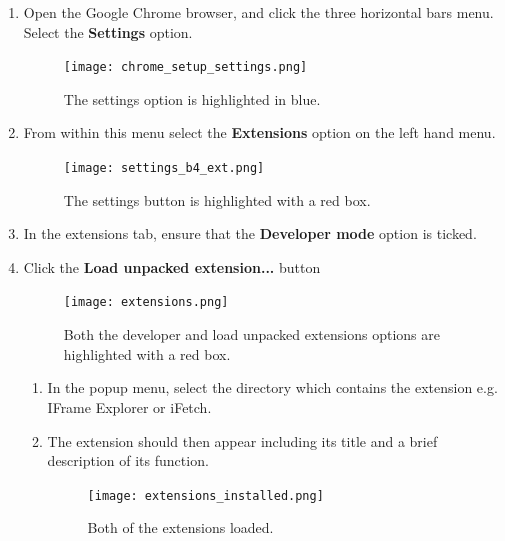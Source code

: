 \documentclass[12pt]{article}
\begin{document}
\begin{enumerate}
    \item Open the Google Chrome browser, and click the three horizontal bars menu. Select the \textbf{Settings} option. 
    
    \begin{figure}[H]
        \centering
        \texttt{[image: chrome\_setup\_settings.png]}
        \caption{The settings option is highlighted in blue.}
        \label{fig:chrome_setup_settings}
    \end{figure}
    
    \item From within this menu select the \textbf{Extensions} option on the left hand menu.
    
    \begin{figure}[H]
        \centering
        \texttt{[image: settings\_b4\_ext.png]}
        \caption{The settings button is highlighted with a red box.}
        \label{fig:settings_before_ext}
    \end{figure}

    
    \item In the extensions tab, ensure that the \textbf{Developer mode} option is ticked. 
    \item Click the \textbf{Load unpacked extension...} button
    
    \begin{figure}[H]
        \centering
        \texttt{[image: extensions.png]}
        \caption{Both the developer and load unpacked extensions options are highlighted with a red box.}
        \label{fig:extensions}
    \end{figure}
    
    \begin{enumerate}
        \item In the popup menu, select the directory which contains the extension e.g. IFrame Explorer or iFetch. 
        \item The extension should then appear including its title and a brief description of its function.
        
        \begin{figure}[H]
            \centering
            \texttt{[image: extensions\_installed.png]}
            \caption{Both of the extensions loaded.}
            \label{fig:extensions_installed}
        \end{figure}
        
    \end{enumerate}
\end{enumerate}
\end{document}
